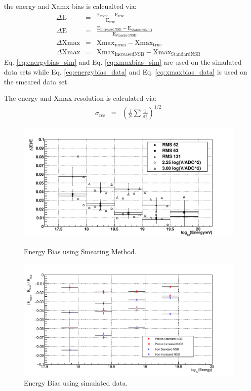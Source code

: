 the energy and Xamx bias is calcualted via:
\begin{eqnarray}
\Delta \mathrm{E} &=& \frac{\mathrm{E}_{\mathrm{recon}} - \mathrm{E}_{\mathrm{true}}}{\mathrm{E}_{\mathrm{true}}}  \label{eq:energybias_sim} \\
\Delta \mathrm{E} &=& \frac{\mathrm{E}_{\mathrm{IncreasedNSB}} - \mathrm{E}_{\mathrm{StandardNSB}}}{\mathrm{E}_{\mathrm{StandardNSB}}} \label{eq:energybias_data} \\
\Delta \mathrm{Xmax} &=& \mathrm{Xmax}_{\mathrm{recon}} - \mathrm{Xmax}_{\mathrm{true}} \label{eq:xmaxbias_sim} \\
\Delta \mathrm{Xmax} &=& \mathrm{Xmax}_{\mathrm{IncreasedNSB}} - \mathrm{Xmax}_{\mathrm{StandardNSB}}\label{eq:xmaxbias_data}
\end{eqnarray}
Eq. \ref{eq:energybias_sim} and Eq. \ref{eq:xmaxbias_sim} are used on the simulated data sets while Eq. \ref{eq:energybias_data} and Eq. \ref{eq:xmaxbias_data} is used on the smeared data set.

The energy and Xmax resolution is calculated via:
\begin{eqnarray}
\sigma_{\mathrm{res}} &=& \left( \frac{1}{\mathrm{N}} \sum \frac{1}{\sigma^2_i} \right)^{1/2}
\end{eqnarray}


\begin{figure}
\centering
\includegraphics[width=\textwidth]{chapters/graphs/SelectionEff/Smearing_RealData_EnergyBias.pdf}
\caption{Energy Bias using Smearing Method.}
\vspace{3mm}
\includegraphics[width=\textwidth]{chapters/graphs/SelectionEff/Simulation_ProtonIron_EnergyBias.pdf}
\caption{Energy Bias using simulated data.}
\end{figure}

